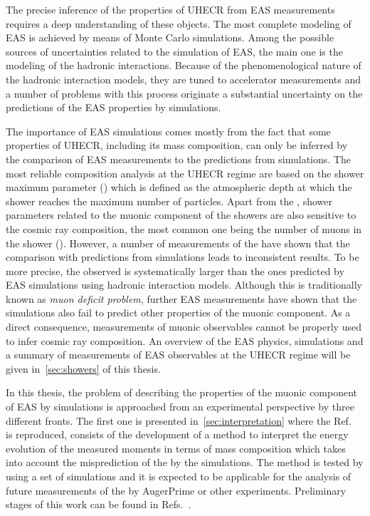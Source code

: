 The precise inference of the properties of UHECR
from EAS measurements requires a deep understanding
of these objects. The most complete modeling of EAS is
achieved by means of Monte Carlo simulations.
Among the possible sources of uncertainties related to the
simulation of EAS, the main one is the modeling
of the hadronic interactions. 
Because of the phenomenological nature of the hadronic interaction models,
they are tuned to accelerator measurements
and a number of problems with this process originate a substantial
uncertainty on the predictions of the EAS properties by simulations.

The importance of EAS simulations comes mostly from the fact that
some properties of UHECR, including its mass composition,
can only be inferred by the comparison of EAS measurements
to the predictions from simulations.
The most reliable composition analysis at the UHECR regime
are based on the shower maximum parameter (\xmax) which is defined
as the atmospheric depth at which the shower reaches the maximum
number of particles. Apart from the \xmax, shower parameters related
to the muonic component of the showers are also sensitive to
the cosmic ray composition, the most common one being the number
of muons in the shower (\nmu). However, a number of measurements of the \nmu
have shown that the comparison with predictions from simulations leads
to inconsistent results. To be more precise, the \nmu observed is systematically
larger than the ones predicted by EAS simulations using hadronic interaction
models. Although this is traditionally known as \emph{muon deficit problem},
further EAS measurements have shown
that the simulations also fail to predict other properties of the muonic component.
As a direct consequence, measurements of muonic observables cannot be
properly used to infer cosmic ray composition.  
An overview of the EAS physics, simulations and a summary of measurements
of EAS observables at the UHECR regime will be given in~\cref{sec:showers}
of this thesis. \newline

In this thesis, the problem of describing the properties of the muonic component of EAS
by simulations is approached from an experimental perspective by three different fronts.
The first one is presented in~\cref{sec:interpretation}
where the Ref.~\cite{Prado:2016akv} is reproduced,
consists of the development of a method to interpret the energy evolution
of the measured \nmu moments in terms of mass composition which takes into account
the misprediction of the \nmu by the simulations. The method is tested by using
a set of simulations and it is expected to be applicable for the analysis
of future measurements of the \nmu by AugerPrime or other experiments.
Preliminary stages of this work can be found in Refs.~\cite{Prado:2015iaz,GAP2014,GAP2015}.

